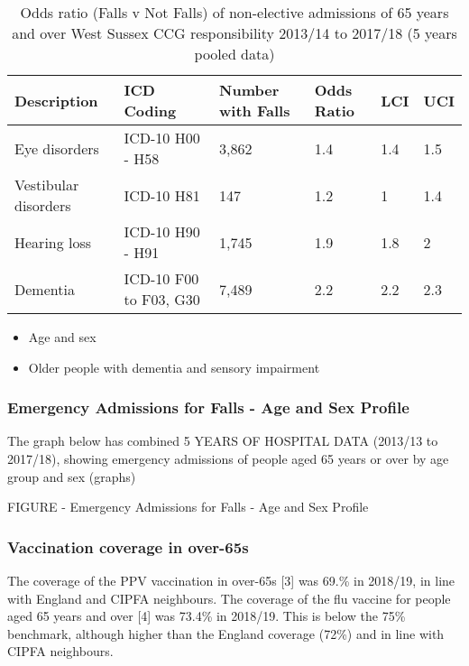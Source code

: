 \begin{table*}
    \caption{Odds ratio (Falls v Not Falls) of non-elective admissions of 65 years and over West Sussex CCG responsibility 2013/14 to 2017/18 (5 years pooled data)}
    \centering
    \begin{tabular}{llllll}
        \toprule
        Description & ICD Coding & Number with Falls & Odds Ratio & LCI & UCI \\
        \midrule
        Eye disorders & ICD-10 H00 - H58 & 3,862 & 1.4 & 1.4 & 1.5 \\
        Vestibular disorders & ICD-10 H81 & 147 & 1.2 & 1 & 1.4 \\
        Hearing loss & ICD-10 H90 - H91 & 1,745 & 1.9 & 1.8 & 2 \\
        Dementia & ICD-10 F00 to F03, G30 & 7,489 & 2.2 & 2.2 & 2.3 \\
        \bottomrule
    \end{tabular}
    \label{tab:op:f_vs_nf}
\end{table*}

\begin{tcolorbox}[colback={boxcolour},title={Key risk factors}]
    \begin{itemize}[noitemsep]
        \item Age and sex
        \item Older people with dementia and sensory impairment
    \end{itemize}
\end{tcolorbox}
    
\subsubsection{Emergency Admissions for Falls - Age and Sex Profile} The graph below has combined 5 YEARS OF HOSPITAL DATA (2013/13 to 2017/18), showing emergency admissions of people aged 65 years or over by age group and sex (graphs)

FIGURE - Emergency Admissions for Falls - Age and Sex Profile

\subsubsection{Vaccination coverage in over-65s}
The coverage of the PPV vaccination in over-65s [3] was 69.\% in 2018/19, in line with England and CIPFA neighbours. The coverage of the flu vaccine for people aged 65 years and over [4] was 73.4\% in 2018/19. This is below the 75\% benchmark, although higher than the England coverage (72\%) and in line with CIPFA neighbours.

